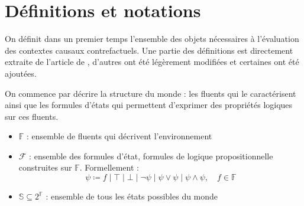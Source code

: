 
\section{Définitions et notations}\label{def}
On définit dans un premier temps l'ensemble des objets nécessaires à l'évaluation des contextes causaux contrefactuels. Une partie des définitions est directement extraite de l'article de \cite{sarmiento_formalising_2025}, d'autres ont été légèrement modifiées et certaines ont été ajoutées.


On commence par décrire la structure du monde : les fluents qui le caractérisent ainsi que les formules d'états qui permettent d'exprimer des propriétés logiques sur ces fluents.
\begin{itemize}
    \item $\mathds{F}$ : ensemble de fluents qui décrivent l’environnement
    \item $\mathcal{F}$ : ensemble des formules d'état, formules de logique propositionnelle construites sur $\mathds{F}$. Formellement :
        \begin{equation}
        \psi \coloneqq f \mid \top \mid \bot \mid \neg \psi \mid \psi \vee \psi \mid \psi \wedge \psi, \quad f \in \mathds{F}
        \end{equation}
        \item $\mathds{S} \subseteq 2^{\mathds{F}}$ : ensemble de tous les états possibles du monde
    \end{itemize}

